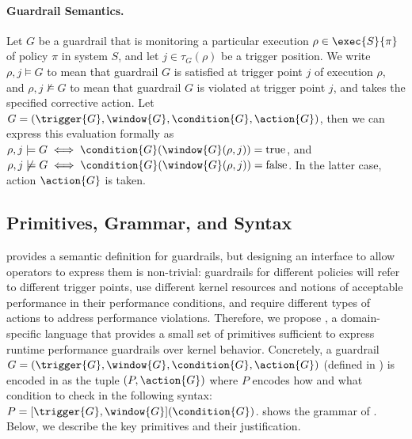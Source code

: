 \paragraph{Guardrail Semantics.}
Let $G$ be a guardrail that is monitoring a particular execution $\rho \in \exec{S}{\pi}$ of policy $\pi$ in system $S$, and let $j \in \tau_G(\rho)$ be a trigger position.
We write \( \rho, j \models G \) to mean that guardrail $G$ is satisfied at trigger point $j$ of execution $\rho$, and \( \rho, j \not\models G \) to mean that guardrail $G$ is violated at trigger point $j$, and takes the specified corrective action.
Let $G = (\trigger{G}, \window{G}, \condition{G}, \action{G}) $, then we can express this evaluation formally as $\rho, j \models G \iff \condition{G}(\window{G}(\rho, j)) = \mathrm{true}$, and $\rho, j \not\models G \iff \condition{G}(\window{G}(\rho, j)) = \mathrm{false}$. In the latter case, action $\action{G}$ is taken.


\subsection{\lang Primitives, Grammar, and Syntax}\label{subsec:gdl-syntax}



 provides a semantic definition for guardrails, but designing an interface to allow operators to express them is non-trivial: guardrails for different policies will refer to different trigger points, use different kernel resources and notions of acceptable performance in their performance conditions, and require different types of actions to address performance violations.
Therefore, we propose \lang, a domain-specific language that provides a small set of primitives sufficient to express runtime performance guardrails over kernel behavior.
Concretely, a guardrail $G=(\trigger{G},\window{G},\condition{G},\action{G})$ (defined in ) is encoded in \lang as the tuple $(P, \action{G})$ where $P$ encodes how and what condition to check in the following syntax: $P = [\trigger{G}, \window{G}](\condition{G})$.
 shows the grammar of \lang.
Below, we describe the key primitives and their justification.

